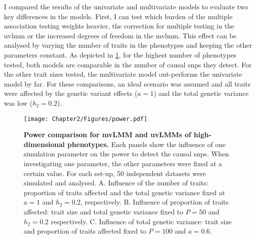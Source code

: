 I compared the results of the univariate and multivariate models to evaluate two key differences in the models. First, I can test which burden of the multiple association testing weights heavier, the correction for multiple testing in the \gls{uvlmm} or the increased degrees of freedom in the \gls{mvlmm}. This effect can be analysed by varying the number of traits in the phenotypes and keeping the other parameters constant. As depicted in \cref{fig:power}, for the highest number of phenotypes tested, both models are comparable in the number of causal \glspl{snp} they detect. For the other trait sizes tested, the multivariate model out-performs the univariate model by far. For these comparisons, an ideal scenario was assumed and all traits were affected by the genetic variant effects (\(a=1\)) and the total genetic variance was low (\(h_2=0.2\)). 
%
\begin{figure}[hbtp]
	\centering
	\texttt{[image: Chapter2/Figures/power.pdf]}
	\caption[\textbf{Power comparison for mvLMM and uvLMMs of high-dimensional phenotypes.}]{\textbf{Power comparison for mvLMM and uvLMMs of high-dimensional phenotypes.} Each panels show the influence of one simulation parameter on the power to detect the causal \glspl{snp}. When investigating one parameter, the other parameters were fixed at a certain value. For each set-up, 50 independent datasets were simulated and analysed. A. Influence of the number of traits: proportion of traits affected and the total genetic variance fixed at \(a=1\) and \(h_2=0.2\), respectively. B. Influence of proportion of traits affected: trait size and total genetic variance fixed to \(P=50\) and \(h_2=0.2\) respectively. C. Influence of total genetic variance:  trait size and  proportion of traits affected fixed to \(P=100\) and \(a=0.6\).} 
 	\label{fig:power}
\end{figure}

